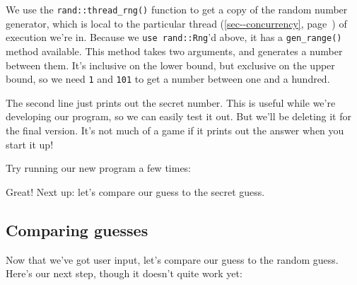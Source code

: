 \documentclass[a4paper,]{book}
\renewcommand*{\hyperref}[2][\ar]{%
  \def\ar{#2}%
  #2 (\autoref{#1}, page~\pageref{#1})}
\newenvironment{Shaded}{\begin{snugshade}}{\end{snugshade}}
\newcommand{\KeywordTok}[1]{\textcolor[rgb]{0.13,0.29,0.53}{\textbf{{#1}}}}
\newcommand{\NormalTok}[1]{{#1}}
\begin{document}
We use the \texttt{rand::thread\_rng()} function to get a copy of the
random number generator, which is local to the particular
\hyperref[sec--concurrency]{thread} of execution we're in. Because we
\texttt{use\ rand::Rng}'d above, it has a \texttt{gen\_range()} method
available. This method takes two arguments, and generates a number
between them. It's inclusive on the lower bound, but exclusive on the
upper bound, so we need \texttt{1} and \texttt{101} to get a number
between one and a hundred.

The second line just prints out the secret number. This is useful while
we're developing our program, so we can easily test it out. But we'll be
deleting it for the final version. It's not much of a game if it prints
out the answer when you start it up!

Try running our new program a few times:

\begin{Shaded}
\end{Shaded}

Great! Next up: let's compare our guess to the secret guess.

\subsection{Comparing guesses}\label{comparing-guesses}

Now that we've got user input, let's compare our guess to the random
guess. Here's our next step, though it doesn't quite work yet:
\end{document}

